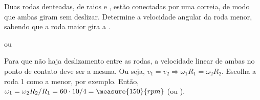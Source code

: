 \begin{question}
    Duas rodas denteadas, de raios  e , estão conectadas por uma correia, de modo que ambas giram sem deslizar.
    Determine a velocidade angular da roda menor, sabendo que a roda maior gira a .

    \begin{answer}
       ou 
    \end{answer}

    \begin{solution}
      Para que não haja deslizamento entre as rodas, a velocidade linear de ambas no ponto de contato deve ser a mesma.
      Ou seja, $v_1 = v_2 \Rightarrow \omega_1 R_1 = \omega_2 R_2$.
      Escolha a roda 1 como a menor, por exemplo.
      Então, $\omega_1 = \omega_2 R_2/R_1 = 60 \cdot 10 / 4 = \measure{150}{rpm}$ (ou ).
    \end{solution}
\end{question}